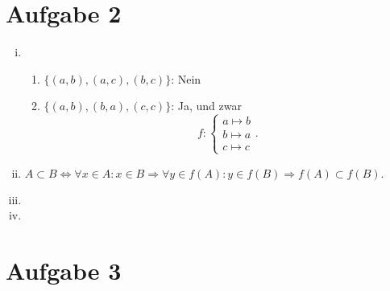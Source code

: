\documentclass[12pt,a4paper]{article}
\begin{document}
\section*{Aufgabe 2}

\begin{enumerate}[(i)]
    \item \begin{enumerate}
        \item $\{(a,b), (a,c), (b,c)\}$: Nein
        \item $\{(a,b), (b,a), (c,c)\}$: Ja, und zwar
        \[
        f: \left\{\begin{array}{l}
        a \mapsto b\\
        b \mapsto a\\
        c \mapsto c
        \end{array}\right..
        \]
    \end{enumerate}

    \item $A \subset B \Leftrightarrow \forall x \in A: x \in B \Rightarrow \forall y \in f(A): y \in f(B) \Rightarrow f(A) \subset f(B).$

    \item

    \item
\end{enumerate}


\section*{Aufgabe 3}
\end{document}

